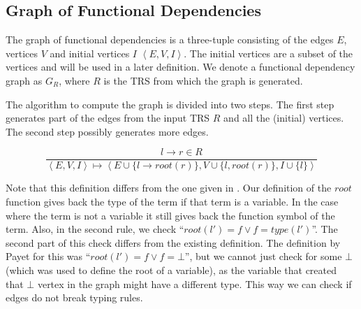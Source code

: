 \subsection{Graph of Functional Dependencies}
The graph of functional dependencies is a three-tuple consisting of the edges $E$, vertices $V$ and initial vertices $I$ $\left< E, V, I \right>$. The initial vertices are a subset of the vertices and will be used in a later definition. We denote a functional dependency graph as $G_R$, where $R$ is the TRS from which the graph is generated. 

The algorithm to compute the graph is divided into two steps. The first step generates part of the edges from the input TRS $R$ and all the (initial) vertices. The second step possibly generates more edges. 
\begin{definition}
\label{def:gofd}
\[
\frac{l \rightarrow r \in R}{\left< E, V, I \right> \mapsto \left< E \cup \{ l \rightarrow \textit{root}(r) \}, V \cup \{ l, \textit{root}(r) \}, I \cup \{ l \} \right>}
\]
\begin{center}
\end{center}
\end{definition}
Note that this definition differs from the one given in \cite{Payet:Unfolding}. Our definition of the $\textit{root}$ function gives back the type of the term if that term is a variable. In the case where the term is not a variable it still gives back the function symbol of the term. Also, in the second rule, we check ``$\textit{root}(l') = f \lor f = \textit{type}(l')$''. The second part of this check differs from the existing definition. The definition by Payet for this was ``$\textit{root}(l') = f \lor f = \bot$'', but we cannot just check for some $\bot$ (which was used to define the root of a variable), as the variable that created that $\bot$ vertex in the graph might have a different type. This way we can check if edges do not break typing rules. 

